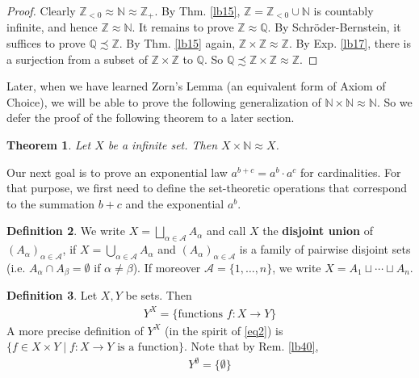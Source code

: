 \documentclass[12pt,b5paper,notitlepage]{article}
\theoremstyle{definition}
\newtheorem{df}{Definition}[section]
\theoremstyle{plain}
\newtheorem{thm}[df]{Theorem}
\newcommand{\scr}{\mathscr}
\newcommand{\Nbb}{\mathbb N}
\newcommand{\Zbb}{\mathbb Z}
\newcommand{\Qbb}{\mathbb Q}
\numberwithin{equation}{section}
\begin{document}
\begin{proof}
Clearly $\Zbb_{<0}\approx\Nbb\approx \Zbb_+$. By Thm. \ref{lb15}, $\Zbb=\Zbb_{<0}\cup\Nbb$ is countably infinite, and hence $\Zbb\approx\Nbb$. It remains to prove $\Zbb\approx\Qbb$. By Schr\"oder-Bernstein, it suffices to prove $\Qbb\precsim\Zbb$.  By Thm. \ref{lb15} again, $\Zbb\times\Zbb\approx\Zbb$. By Exp. \ref{lb17}, there is a surjection from a subset of $\Zbb\times\Zbb$ to $\Qbb$. So $\Qbb\precsim\Zbb\times\Zbb\approx\Zbb$.
\end{proof}



Later, when we have learned Zorn's Lemma (an equivalent form of Axiom of Choice), we will be able to prove the following generalization of $\Nbb\times\Nbb\approx\Nbb$. So we defer the proof of the following theorem to a later section.

\begin{thm}\label{lb16}
Let $X$ be a infinite set. Then $X\times\Nbb\approx X$.
\end{thm}





Our next goal is to prove an exponential law $a^{b+c}=a^b\cdot a^c$ for cardinalities. For that purpose, we first need to define the set-theoretic operations that correspond to the summation $b+c$ and the exponential $a^b$.


\begin{df}
We write $X=\bigsqcup_{\alpha\in\scr A}A_\alpha$ \index{A@$\bigsqcup_{\alpha\in\scr A}A_\alpha$, the disjoint union} and call $X$ the \textbf{disjoint union}  of $(A_\alpha)_{\alpha\in\scr A}$,  if $X=\bigcup_{\alpha\in\scr A}A_\alpha$ and $(A_\alpha)_{\alpha\in\scr A}$ is a family of pairwise disjoint sets (i.e. $A_\alpha\cap A_\beta=\emptyset$ if $\alpha\neq\beta$). If moreover $\scr A=\{1,\dots,n\}$, we write $X=A_1\sqcup\cdots\sqcup A_n$.
\end{df}

\begin{df}
Let $X,Y$ be sets. Then 
\begin{align}
Y^X=\{\text{functions }f:X\rightarrow Y\}
\end{align}
A more precise definition of $Y^X$ (in the spirit of \eqref{eq2}) is $\{f\in X\times Y \mid f:X\rightarrow Y\text{ is a function}\}$. Note that by Rem. \ref{lb40},
\begin{align}
Y^\emptyset=\{\emptyset\}  \label{eq10}
\end{align}
\end{df}
\end{document}
